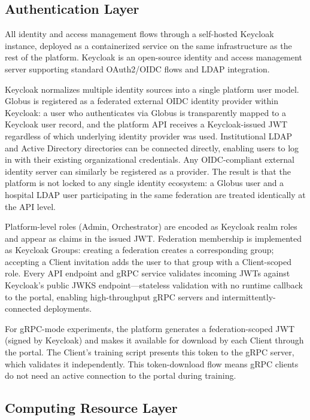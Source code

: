 \documentclass[conference]{IEEEtran}
\begin{document}
\subsection{Authentication Layer}

All identity and access management flows through a self-hosted
Keycloak instance, deployed as a containerized service on the same
infrastructure as the rest of the platform. Keycloak is an
open-source identity and access management server supporting standard
OAuth2/OIDC flows and LDAP integration.

Keycloak normalizes multiple identity sources into a single platform
user model. Globus is registered as a federated external OIDC identity
provider within Keycloak: a user who authenticates via Globus is
transparently mapped to a Keycloak user record, and the platform API
receives a Keycloak-issued JWT regardless of which underlying identity
provider was used. Institutional LDAP and Active Directory directories
can be connected directly, enabling users to log in with their existing
organizational credentials. Any OIDC-compliant external identity server
can similarly be registered as a provider. The result is that the
platform is not locked to any single identity ecosystem: a Globus user
and a hospital LDAP user participating in the same federation are
treated identically at the API level.

Platform-level roles (Admin, Orchestrator) are encoded as Keycloak
realm roles and appear as claims in the issued JWT. Federation
membership is implemented as Keycloak Groups: creating a federation
creates a corresponding group; accepting a Client invitation adds the
user to that group with a Client-scoped role. Every API endpoint and
gRPC service validates incoming JWTs against Keycloak's public JWKS
endpoint---stateless validation with no runtime callback to the portal,
enabling high-throughput gRPC servers and intermittently-connected
deployments.

For gRPC-mode experiments, the platform generates a
federation-scoped JWT (signed by Keycloak) and makes it available for
download by each Client through the portal. The Client's training
script presents this token to the gRPC server, which validates it
independently. This token-download flow means gRPC clients do not need
an active connection to the portal during training.

\subsection{Computing Resource Layer}
\end{document}

